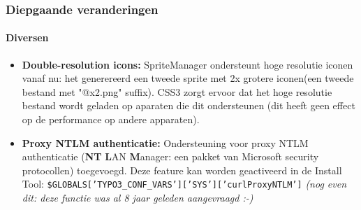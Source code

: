 
\begin{frame}[fragile]
	\frametitle{Diepgaande veranderingen}
	\framesubtitle{Diversen}

	\begin{itemize}

		\item \textbf{Double-resolution icons:}\newline
			\small
				SpriteManager ondersteunt hoge resolutie iconen vanaf nu: het generereerd een tweede sprite met 2x grotere iconen(een tweede bestand met "@x2.png" suffix). CSS3 zorgt ervoor dat het hoge resolutie bestand wordt geladen op aparaten die dit ondersteunen\newline
				(dit heeft geen effect op de performance op andere apparaten).
			\normalsize

		\item \textbf{Proxy NTLM authenticatie:}\newline
			\small
				Ondersteuning voor proxy NTLM authenticatie (\textbf{NT} \textbf{L}AN \textbf{M}anager: een pakket van Microsoft security protocollen) toegevoegd. Deze feature kan worden geactiveerd in de Install Tool:\newline
				\newline
				\texttt{\$GLOBALS['TYPO3\_CONF\_VARS']['SYS']['curlProxyNTLM']}\newline
				\newline
				\smaller
				\emph{(nog even dit: deze functie was al 8 jaar geleden aangevraagd :-)}

			\normalsize

	\end{itemize}
	
\end{frame}


